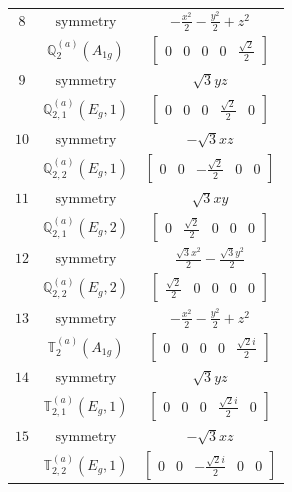 \documentclass[fleqn,8pt,landscape]{jsarticle}
\begin{document}
\begin{longtable}{ccc}
$ 8 $ & $ \text{symmetry} $ & $ - \frac{x^{2}}{2} - \frac{y^{2}}{2} + z^{2} $ \\
$  $ & $ \mathbb{Q}_{2}^{(a)}(A_{1g}) $ & $ \begin{bmatrix} 0 & 0 & 0 & 0 & \frac{\sqrt{2}}{2} \end{bmatrix} $ \\ \hline
$ 9 $ & $ \text{symmetry} $ & $ \sqrt{3} y z $ \\
$  $ & $ \mathbb{Q}_{2,1}^{(a)}(E_{g},1) $ & $ \begin{bmatrix} 0 & 0 & 0 & \frac{\sqrt{2}}{2} & 0 \end{bmatrix} $ \\ \hline
$ 10 $ & $ \text{symmetry} $ & $ - \sqrt{3} x z $ \\
$  $ & $ \mathbb{Q}_{2,2}^{(a)}(E_{g},1) $ & $ \begin{bmatrix} 0 & 0 & - \frac{\sqrt{2}}{2} & 0 & 0 \end{bmatrix} $ \\ \hline
$ 11 $ & $ \text{symmetry} $ & $ \sqrt{3} x y $ \\
$  $ & $ \mathbb{Q}_{2,1}^{(a)}(E_{g},2) $ & $ \begin{bmatrix} 0 & \frac{\sqrt{2}}{2} & 0 & 0 & 0 \end{bmatrix} $ \\ \hline
$ 12 $ & $ \text{symmetry} $ & $ \frac{\sqrt{3} x^{2}}{2} - \frac{\sqrt{3} y^{2}}{2} $ \\
$  $ & $ \mathbb{Q}_{2,2}^{(a)}(E_{g},2) $ & $ \begin{bmatrix} \frac{\sqrt{2}}{2} & 0 & 0 & 0 & 0 \end{bmatrix} $ \\ \hline
$ 13 $ & $ \text{symmetry} $ & $ - \frac{x^{2}}{2} - \frac{y^{2}}{2} + z^{2} $ \\
$  $ & $ \mathbb{T}_{2}^{(a)}(A_{1g}) $ & $ \begin{bmatrix} 0 & 0 & 0 & 0 & \frac{\sqrt{2} i}{2} \end{bmatrix} $ \\ \hline
$ 14 $ & $ \text{symmetry} $ & $ \sqrt{3} y z $ \\
$  $ & $ \mathbb{T}_{2,1}^{(a)}(E_{g},1) $ & $ \begin{bmatrix} 0 & 0 & 0 & \frac{\sqrt{2} i}{2} & 0 \end{bmatrix} $ \\ \hline
$ 15 $ & $ \text{symmetry} $ & $ - \sqrt{3} x z $ \\
$  $ & $ \mathbb{T}_{2,2}^{(a)}(E_{g},1) $ & $ \begin{bmatrix} 0 & 0 & - \frac{\sqrt{2} i}{2} & 0 & 0 \end{bmatrix} $ \\ \hline

\end{longtable}
\end{document}
